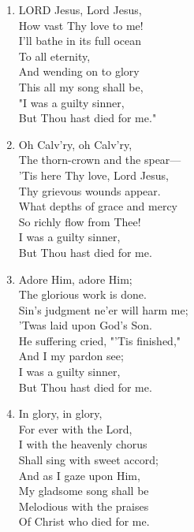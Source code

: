 \documentclass[11pt,a4paper]{article}
\begin{document}
\begin{enumerate}
    \item LORD Jesus, Lord Jesus, \\
            How vast Thy love to me! \\
        I'll bathe in its full ocean \\
            To all eternity, \\
        And wending on to glory \\
            This all my song shall be, \\
        "I was a guilty sinner, \\
            But Thou hast died for me."

    \item Oh Calv'ry, oh Calv'ry, \\
            The thorn-crown and the spear--- \\
        'Tis here Thy love, Lord Jesus, \\
            Thy grievous wounds appear. \\
        What depths of grace and mercy \\
            So richly flow from Thee! \\
        I was a guilty sinner, \\
            But Thou hast died for me.

    \item Adore Him, adore Him; \\
            The glorious work is done. \\
        Sin's judgment ne'er will harm me; \\
            'Twas laid upon God's Son. \\
        He suffering cried, "'Tis finished," \\
            And I my pardon see; \\
        I was a guilty sinner, \\
            But Thou hast died for me.

    \item In glory, in glory, \\
            For ever with the Lord, \\
        I with the heavenly chorus \\
            Shall sing with sweet accord; \\
        And as I gaze upon Him, \\
            My gladsome song shall be \\
        Melodious with the praises \\
            Of Christ who died for me.

\end{enumerate}
\end{document}
